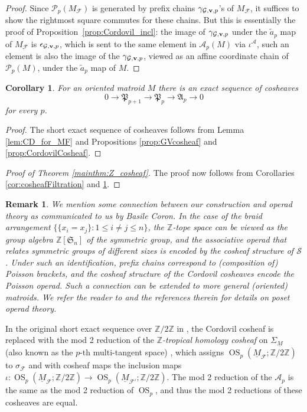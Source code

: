 \documentclass{amsart}
\newtheorem{corollary}[theorem]{Corollary}
\newtheorem{remark}[theorem]{Remark}
\newcommand\Acal{{\mathcal A}}
\newcommand\Fcal{{\mathcal F}}
\newcommand\Gcal{{\mathcal G}}
\newcommand\Pcal{{\mathcal P}}
\newcommand\vv{{\bf v}}
\newcommand\ZZ{{\mathbb Z}}
\newcommand\Ztwo{{\mathbb Z}/2{\mathbb Z}}
\newcommand\Pfrak{{\mathfrak P}}
\DeclareMathOperator{\OS}{OS}
\begin{document}
{\begin{proof}
Since $\Pcal_p(M_\Fcal)$ is generated by prefix chains $\gamma_{\Gcal,\vv,p}$'s of $M_\Fcal$, it suffices to show the rightmost square commutes for these chains. But this is essentially the proof of Proposition~\ref{prop:Cordovil_incl}: the image of $\gamma_{\Gcal,\vv,p}$ under the $\tilde{a}_p$ map of $M_\Fcal$ is $\epsilon_{\Gcal,\vv,p}$, which is sent to the same element in $\Acal_p(M)$ via $\iota^\Acal$, such an element is also the image of the $\gamma_{\Gcal,\vv,p}$, viewed as an affine coordinate chain of $\Pcal_p(M)$, under the $\tilde{a}_p$ map of $M$.
\end{proof}

\begin{corollary} \label{coro:SES_cosheaves}
For an oriented matroid $M$ there is an exact sequence of cosheaves 
$$0 \to \Pfrak_{p+1} \to \Pfrak_p \to \mathfrak{A}_p \to 0$$
for every $p$. 
\end{corollary}



\begin{proof}
   The short exact sequence of cosheaves follows from Lemma \ref{lem:CD_for_MF} and Propositions \ref{prop:GVcosheaf} 
and \ref{prop:CordovilCosheaf}. 
\end{proof}

\begin{proof}[Proof of Theorem \ref{mainthm:Z_cosheaf}]
The proof now follows from Corollaries \ref{cor:cosheafFiltration} and \ref{coro:SES_cosheaves}. 
\end{proof}


\begin{remark} \rm
    We mention some connection between our construction and operad theory as communicated to us by Basile Coron. In the case of the braid arrangement $\{\{x_i=x_j\}:1\leq i\neq j\leq n\}$, the $\ZZ$-tope space can be viewed as the group algebra $\ZZ[\mathfrak{S}_n]$ of the symmetric group, and the {\em associative operad} that relates symmetric groups of different sizes is encoded by the cosheaf structure of $\mathcal{S}$. Under such an identification, prefix chains correspond to (composition of) Poisson brackets, and the cosheaf structure of the Cordovil cosheaves encode the {\em Poisson operad}. Such a connection can be extended to more general (oriented) matroids. We refer the reader to \cite{Coron2025} and the references therein for details on poset operad theory.
\end{remark}

In the original short exact sequence over $\Ztwo$ in \cite{RS}, the Cordovil cosheaf is replaced with  the mod 2 reduction of the {\em $\ZZ$-tropical homology cosheaf} on $\Sigma_{\underline{M}}$ (also known as the $p$-th multi-tangent space) \cite{IKMZ}, which  assigns $\OS_p(\underline{M}_{\Fcal}; \Ztwo)$ to $\sigma_{\Fcal}$ and with cosheaf maps the inclusion maps $\iota: \OS_p(\underline{M}_{\Fcal}; \Ztwo) \to \OS_p(\underline{M}_{\Fcal'}; \Ztwo)$. The mod 2 reduction of the $\mathcal{A}_p$ is the same as the mod 2 reduction of $\OS_p$, and thus the mod 2 reductions of these cosheaves are equal. 

}
\end{document}
